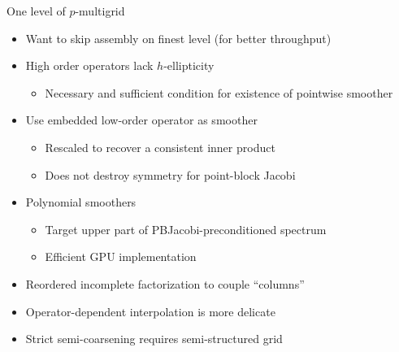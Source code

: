\begin{frame}{One level of $p$-multigrid}
  \begin{itemize}
  \item Want to skip assembly on finest level (for better throughput)
  \item High order operators lack $h$-ellipticity
    \begin{itemize}
    \item Necessary and sufficient condition for existence of pointwise smoother
    \end{itemize}
  \item Use embedded low-order operator as smoother
    \begin{itemize}
    \item Rescaled to recover a consistent inner product
    \item Does not destroy symmetry for point-block Jacobi
    \end{itemize}
  \item Polynomial smoothers
    \begin{itemize}
    \item Target upper part of PBJacobi-preconditioned spectrum
    \item Efficient GPU implementation
    \end{itemize}
  \item Reordered incomplete factorization to couple ``columns''
  \item Operator-dependent interpolation is more delicate
  \item Strict semi-coarsening requires semi-structured grid
  \end{itemize}
\end{frame}
